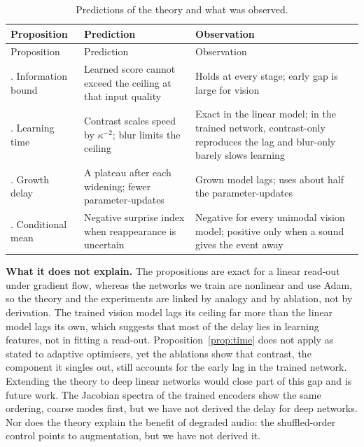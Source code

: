 \documentclass{article}
\theoremstyle{plain}
\theoremstyle{remark}
\begin{document}
\begin{longtable}[]{@{}
  >{\raggedright\arraybackslash}p{}
  >{\raggedright\arraybackslash}p{}
  >{\raggedright\arraybackslash}p{}@{}}
\caption{Predictions of the theory and what was observed.}\label{tab:predictions}\tabularnewline
\toprule\noalign{}
Proposition & Prediction & Observation \\
\midrule\noalign{}
\endfirsthead
\toprule\noalign{}
Proposition & Prediction & Observation \\
\midrule\noalign{}
\endhead
\bottomrule\noalign{}
\endlastfoot
1. Information bound & Learned score cannot exceed the ceiling at that input quality & Holds at every stage; early gap is large for vision \\
2. Learning time & Contrast scales speed by \(\kappa^{-2}\); blur limits the ceiling & Exact in the linear model; in the trained network, contrast-only reproduces the lag and blur-only barely slows learning \\
3. Growth delay & A plateau after each widening; fewer parameter-updates & Grown model lags; uses about half the parameter-updates \\
4. Conditional mean & Negative surprise index when reappearance is uncertain & Negative for every unimodal vision model; positive only when a sound gives the event away \\
\end{longtable}

\textbf{What it does not explain.} The propositions are exact for a linear read-out under gradient flow, whereas the networks we train are nonlinear and use Adam, so the theory and the experiments are linked by analogy and by ablation, not by derivation. The trained vision model lags its ceiling far more than the linear model lags its own, which suggests that most of the delay lies in learning features, not in fitting a read-out. Proposition~\ref{prop:time} does not apply as stated to adaptive optimisers, yet the ablations show that contrast, the component it singles out, still accounts for the early lag in the trained network. Extending the theory to deep linear networks \autocite{saxe2019mathematical} would close part of this gap and is future work. The Jacobian spectra of the trained encoders show the same ordering, coarse modes first, but we have not derived the delay for deep networks. Nor does the theory explain the benefit of degraded audio: the shuffled-order control points to augmentation, but we have not derived it.
\end{document}

